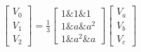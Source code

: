 \documentclass[preview]{standalone}
\begin{document}
\begin{align*}
\begin{bmatrix} V_0 \\ V_1 \\ V_2 \end{bmatrix} = \frac{1}{3} \begin{bmatrix} 1 \& 1 \& 1 \\ 1 \& a \& a^2 \\ 1 \& a^2 \& a \end{bmatrix} \begin{bmatrix} V_a \\ V_b \\ V_c \end{bmatrix}
\end{align*}
\end{document}
